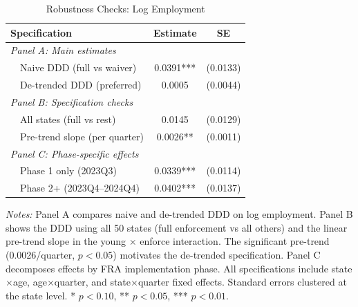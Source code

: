 \begin{table}[htbp]
\begin{threeparttable}
\centering
\caption{Robustness Checks: Log Employment}
\label{tab:robust}
\begin{tabular}{lcc}
\toprule
Specification & Estimate & SE \\
\midrule
\multicolumn{3}{l}{\textit{Panel A: Main estimates}} \\
~~Naive DDD (full vs waiver) & 0.0391*** & (0.0133) \\
~~De-trended DDD (preferred) & 0.0005 & (0.0044) \\
[3pt]
\multicolumn{3}{l}{\textit{Panel B: Specification checks}} \\
~~All states (full vs rest) & 0.0145 & (0.0129) \\
~~Pre-trend slope (per quarter) & 0.0026** & (0.0011) \\
[3pt]
\multicolumn{3}{l}{\textit{Panel C: Phase-specific effects}} \\
~~Phase 1 only (2023Q3) & 0.0339*** & (0.0114) \\
~~Phase 2+ (2023Q4--2024Q4) & 0.0402*** & (0.0137) \\
\bottomrule
\end{tabular}
\begin{tablenotes}[flushleft]
\small
\item \textit{Notes:} Panel A compares naive and de-trended DDD on log employment. Panel B shows the DDD using all 50 states (full enforcement vs all others) and the linear pre-trend slope in the young $\times$ enforce interaction. The significant pre-trend (0.0026/quarter, $p<0.05$) motivates the de-trended specification. Panel C decomposes effects by FRA implementation phase. All specifications include state$\times$age, age$\times$quarter, and state$\times$quarter fixed effects. Standard errors clustered at the state level. * $p<0.10$, ** $p<0.05$, *** $p<0.01$.
\end{tablenotes}
\end{threeparttable}
\end{table}

